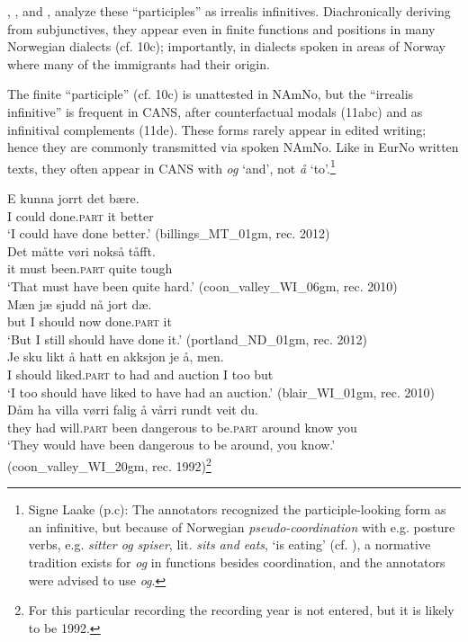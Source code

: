 \documentclass[output=paper]{langscibook}
\begin{document}
\citet{Sandoey1991, Sandoey2008}, \citet{Julien2003}, and \citet{Eide2011Ghost, Eide2021}, analyze these “participles” as irrealis infinitives. Diachronically deriving from subjunctives, they appear even in finite functions and positions in many Norwegian dialects (cf. 10c); importantly, in dialects spoken in areas of Norway where many of the immigrants had their origin.\largerpage 

The finite “participle” (cf. 10c) is unattested in NAmNo, but the “irrealis infinitive” is frequent in CANS, after counterfactual modals (11abc) and as infinitival complements (11de). These forms rarely appear in edited writing; hence they are commonly transmitted via spoken NAmNo. Like in EurNo written texts, they often appear in CANS with \textit{og} ‘and’, not \textit{å} ‘to’.{\footnote{Signe Laake (p.c): The annotators recognized the participle\hyp looking form as an infinitive, but because of Norwegian \textit{pseudo\hyp coordination} with e.g. posture verbs, e.g. \textit{sitter og spiser}, lit. \textit{sits and eats}, ‘is eating’ (cf. ), a normative tradition exists for \textit{og} in functions besides coordination, and the annotators were advised to use \textit{og}.}} 

\ea%
    \label{ex:eide:11}
    \ea  
    \gll E kunna jorrt det bære.           \\
         I could done.\textsc{part} it better         \\
    \glt ‘I could have done better.’ ({{billings\_MT\_01gm}}, rec. 2012)\\
    \ex  
    \gll Det måtte vøri nokså tåfft.         \\
         it must been.\textsc{part} quite tough        \\
    \glt ‘That must have been quite hard.’ ({{coon\_valley\_WI\_06gm}}, rec. 2010)\\
    \ex  
    \gll Mæn jæ sjudd nå jort dæ.         \\
         but I should now done.\textsc{part} it        \\
    \glt ‘But I still should have done it.’ ({{portland\_ND\_01gm}}, rec. 2012)\\
    \ex  
    \gll Je sku likt å hatt en akksjon je å, men.      \\
         I should liked.\textsc{part} to had and auction I too but  \\
    \glt ‘I too should have liked to have had an auction.’ ({blair\_WI\_01gm}, rec. 2010)\\
    \ex  
    \gll Dåm ha villa vørri falig  å vårri rundt veit du.          \\
         they had will.\textsc{part} been dangerous   to be.\textsc{part} around know you   \\
    \glt ‘They would have been dangerous to be around, you know.’ ({{coon\_valley\_WI\_20gm}}, rec. 1992)\footnote{For this particular recording the recording year is not entered, but it is likely to be 1992.} \\
    \z %
\z
\end{document}
